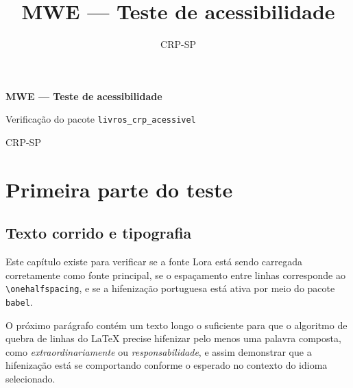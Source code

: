 \documentclass[11pt,a5paper,twoside,openright]{scrbook}
\title{MWE — Teste de acessibilidade}
\author{CRP-SP}
\begin{document}
\frontmatter
\pagestyle{pretext}

\begin{titlepage}
    \centering
    \vspace*{\fill}
    {\huge\bfseries\color{crp1} MWE — Teste de acessibilidade\par}
    \vspace{2\baselineskip}
    {\Large Verificação do pacote \texttt{livros\_crp\_acessivel}\par}
    \vspace{\fill}
    {\large CRP-SP\par}
    \vspace{2\baselineskip}
\end{titlepage}

\tableofcontents

\mainmatter
\pagestyle{scrheadings}

\part{Primeira parte do teste}

\chapter{Texto corrido e tipografia}

Este capítulo existe para verificar se a fonte Lora está sendo
carregada corretamente como fonte principal, se o espaçamento
entre linhas corresponde ao \texttt{\textbackslash onehalfspacing},
e se a hifenização portuguesa está ativa por meio do pacote
\texttt{babel}.

O próximo parágrafo contém um texto longo o suficiente para que
o algoritmo de quebra de linhas do \LaTeX{} precise hifenizar
pelo menos uma palavra composta, como
\emph{extraordinariamente} ou \emph{responsabilidade}, e assim
demonstrar que a hifenização está se comportando conforme o
esperado no contexto do idioma selecionado.
\end{document}
